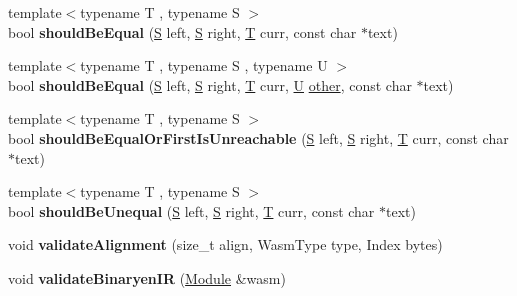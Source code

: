 \begin{DoxyCompactItemize}
{\footnotesize template$<$typename T , typename S $>$ }\\bool {\bfseries should\+Be\+Equal} (\mbox{\hyperlink{struct_s}{S}} left, \mbox{\hyperlink{struct_s}{S}} right, \mbox{\hyperlink{struct_t}{T}} curr, const char $\ast$text)
\item 
\mbox{\label{structwasm_1_1_wasm_validator_ac8acc90bcb21297b8d666f5517edb07b}} 
{\footnotesize template$<$typename T , typename S , typename U $>$ }\\bool {\bfseries should\+Be\+Equal} (\mbox{\hyperlink{struct_s}{S}} left, \mbox{\hyperlink{struct_s}{S}} right, \mbox{\hyperlink{struct_t}{T}} curr, \mbox{\hyperlink{union_u}{U}} \mbox{\hyperlink{structother}{other}}, const char $\ast$text)
\item 
\mbox{\label{structwasm_1_1_wasm_validator_ab09212e6a8b17adea7d4be8973a43902}} 
{\footnotesize template$<$typename T , typename S $>$ }\\bool {\bfseries should\+Be\+Equal\+Or\+First\+Is\+Unreachable} (\mbox{\hyperlink{struct_s}{S}} left, \mbox{\hyperlink{struct_s}{S}} right, \mbox{\hyperlink{struct_t}{T}} curr, const char $\ast$text)
\item 
\mbox{\label{structwasm_1_1_wasm_validator_a000feb561b965d86ed4c7de936ed9bd7}} 
{\footnotesize template$<$typename T , typename S $>$ }\\bool {\bfseries should\+Be\+Unequal} (\mbox{\hyperlink{struct_s}{S}} left, \mbox{\hyperlink{struct_s}{S}} right, \mbox{\hyperlink{struct_t}{T}} curr, const char $\ast$text)
\item 
\mbox{\label{structwasm_1_1_wasm_validator_a6de7ba395c9e83e7bb7f28024ff7eb8a}} 
void {\bfseries validate\+Alignment} (size\+\_\+t align, Wasm\+Type type, Index bytes)
\item 
\mbox{\label{structwasm_1_1_wasm_validator_add8564825d00c29c39660d1a7e3c6ed3}} 
void {\bfseries validate\+Binaryen\+IR} (\mbox{\hyperlink{classwasm_1_1_module}{Module}} \&wasm)
\end{DoxyCompactItemize}
